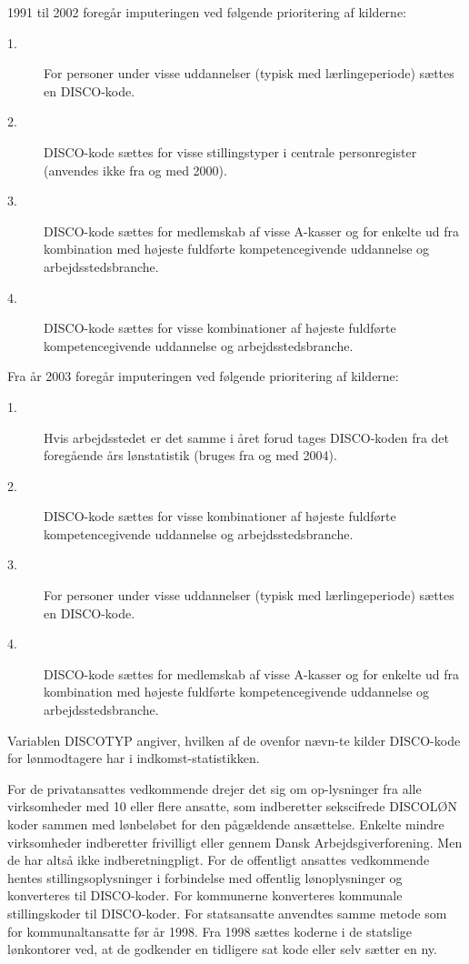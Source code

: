 1991 til 2002 foregår imputeringen ved følgende prioritering af kilderne: 
\begin{description}
  \item[1.] For personer under visse uddannelser (typisk med lærlingeperiode) sættes en DISCO-kode.
  \item[2.] DISCO-kode sættes for visse stillingstyper i centrale personregister (anvendes ikke fra og med 2000).
  \item[3.] DISCO-kode sættes for medlemskab af visse A-kasser og for enkelte ud fra kombination med højeste fuldførte kompetencegivende uddannelse og arbejdsstedsbranche.
  \item[4.] DISCO-kode sættes for visse kombinationer af højeste fuldførte kompetencegivende uddannelse og arbejdsstedsbranche.
\end{description}

Fra år 2003 foregår imputeringen ved følgende prioritering af kilderne:
\begin{description}
  \item[1.] Hvis arbejdsstedet er det samme i året forud tages DISCO-koden fra det foregående års lønstatistik (bruges fra og med 2004).
  \item[2.] DISCO-kode sættes for visse kombinationer af højeste fuldførte kompetencegivende uddannelse og arbejdsstedsbranche.
  \item[3.] For personer under visse uddannelser (typisk med lærlingeperiode) sættes en DISCO-kode.
  \item[4.] DISCO-kode sættes for medlemskab af visse A-kasser og for enkelte ud fra kombination med højeste fuldførte kompetencegivende uddannelse og arbejdsstedsbranche.
\end{description}

Variablen DISCOTYP angiver, hvilken af de ovenfor nævn-te kilder DISCO-kode for lønmodtagere har i indkomst-statistikken. 

For de privatansattes vedkommende drejer det sig om op-lysninger fra alle virksomheder med 10 eller flere ansatte, som indberetter sekscifrede DISCOLØN koder sammen med lønbeløbet for den pågældende ansættelse. Enkelte mindre virksomheder indberetter frivilligt eller gennem Dansk Arbejdsgiverforening. Men de har altså ikke indberetningpligt. For de offentligt ansattes vedkommende hentes stillingsoplysninger i forbindelse med offentlig lønoplysninger og konverteres til DISCO-koder. For kommunerne konverteres kommunale stillingskoder til DISCO-koder. For statsansatte anvendtes samme metode som for kommunaltansatte før år 1998. Fra 1998 sættes koderne i de statslige lønkontorer ved, at de godkender en tidligere sat kode eller selv sætter en ny.


